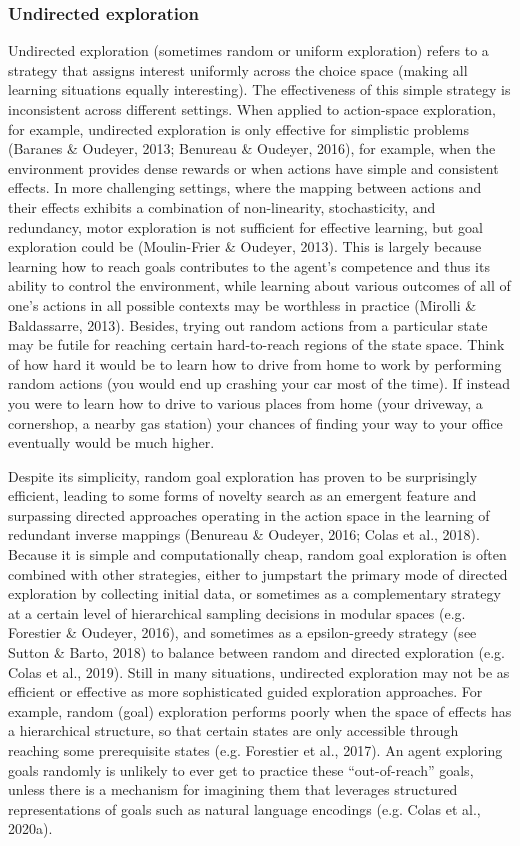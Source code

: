 \subsubsection{Undirected exploration}
Undirected exploration (sometimes random or uniform exploration) refers to a strategy that assigns interest uniformly across the choice space (making all learning situations equally interesting). The effectiveness of this simple strategy is inconsistent across different settings. When applied to action-space exploration, for example, undirected exploration is only effective for simplistic problems (Baranes \& Oudeyer, 2013; Benureau \& Oudeyer, 2016), for example, when the environment provides dense rewards or when actions have simple and consistent effects. In more challenging settings, where the mapping between actions and their effects exhibits a combination of non-linearity, stochasticity, and redundancy, motor exploration is not sufficient for effective learning, but goal exploration could be (Moulin-Frier \& Oudeyer, 2013). This is largely because learning how to reach goals contributes to the agent’s competence and thus its ability to control the environment, while learning about various outcomes of all of one’s actions in all possible contexts may be worthless in practice (Mirolli \& Baldassarre, 2013). Besides, trying out random actions from a particular state may be futile for reaching certain hard-to-reach regions of the state space. Think of how hard it would be to learn how to drive from home to work by performing random actions (you would end up crashing your car most of the time). If instead you were to learn how to drive to various places from home (your driveway, a cornershop, a nearby gas station) your chances of finding your way to your office eventually would be much higher. 

Despite its simplicity, random goal exploration has proven to be surprisingly efficient, leading to some forms of novelty search as an emergent feature and surpassing directed approaches operating in the action space in the learning of redundant inverse mappings (Benureau \& Oudeyer, 2016; Colas et al., 2018). Because it is simple and computationally cheap, random goal exploration is often combined with other strategies, either to jumpstart the primary mode of directed exploration by collecting initial data, or sometimes as a complementary strategy at a certain level of hierarchical sampling decisions in modular spaces (e.g. Forestier \& Oudeyer, 2016), and sometimes as a epsilon-greedy strategy (see Sutton \& Barto, 2018) to balance between random and directed exploration (e.g. Colas et al., 2019). Still in many situations, undirected exploration may not be as efficient or effective as more sophisticated guided exploration approaches. For example, random (goal) exploration performs poorly when the space of effects has a hierarchical structure, so that certain states are only accessible through reaching some prerequisite states (e.g. Forestier et al., 2017). An agent exploring goals randomly is unlikely to ever get to practice these “out-of-reach” goals, unless there is a mechanism for imagining them that leverages structured representations of goals such as natural language encodings (e.g. Colas et al., 2020a).


